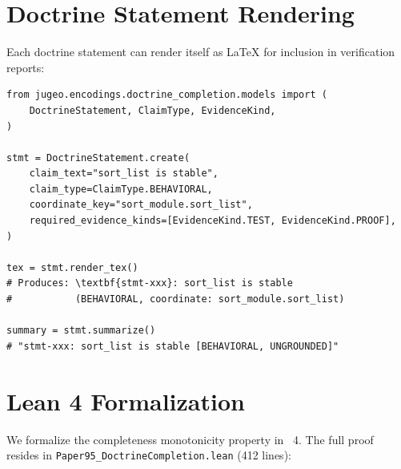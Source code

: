 \documentclass[11pt]{article}
\begin{document}
\section{Doctrine Statement Rendering}\label{sec:rendering}

Each doctrine statement can render itself as \LaTeX{} for inclusion in
verification reports:

\begin{lstlisting}[style=jugeo-python]
from jugeo.encodings.doctrine_completion.models import (
    DoctrineStatement, ClaimType, EvidenceKind,
)

stmt = DoctrineStatement.create(
    claim_text="sort_list is stable",
    claim_type=ClaimType.BEHAVIORAL,
    coordinate_key="sort_module.sort_list",
    required_evidence_kinds=[EvidenceKind.TEST, EvidenceKind.PROOF],
)

tex = stmt.render_tex()
# Produces: \textbf{stmt-xxx}: sort_list is stable
#           (BEHAVIORAL, coordinate: sort_module.sort_list)

summary = stmt.summarize()
# "stmt-xxx: sort_list is stable [BEHAVIORAL, UNGROUNDED]"
\end{lstlisting}

\section{Lean 4 Formalization}\label{sec:lean}

We formalize the completeness monotonicity property in \LEAN~4.  The full
proof resides in \texttt{Paper95\_DoctrineCompletion.lean} (412 lines):
\end{document}
